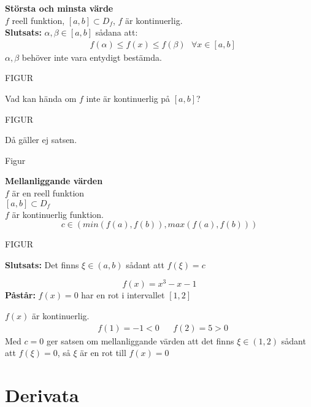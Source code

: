 \begin{sats}
    \textbf{Största och minsta värde}\\
    $f$ reell funktion, $[a, b] \subset D_f$, $f$ är kontinuerlig.\\
    \textbf{Slutsats:} $\alpha,\beta \in [a,b]$ sådana att:
    \begin{align*}
    		&f(\alpha) \le f(x) \le f(\beta) \mbox{ } \forall x \in [a,b]
	\end{align*}
	$\alpha, \beta$ behöver inte vara entydigt bestämda.
	\begin{center}
		FIGUR
	\end{center}
\end{sats}
\begin{Rem}
	Vad kan hända om $f$ inte är kontinuerlig på $[a,b]$?
	\begin{center}
		FIGUR
	\end{center}
	Då gäller ej satsen.
\end{Rem}
\begin{Ex}
    \begin{center}
    	Figur
    \end{center}
\end{Ex}
\begin{sats}
    \textbf{Mellanliggande värden}\\
    $f$ är en reell funktion\\
    $[a,b] \subset D_f$\\
    $f$ är kontinuerlig funktion. 
    \[
    c \in (min(f(a), f(b)), max(f(a), f(b)))
    \]
    \begin{center}
    	FIGUR
    \end{center}
    \textbf{Slutsats:} Det finns $\xi \in (a,b)$ sådant att $f(\xi) = c$
\end{sats}
\begin{Ex}
    \[
    f(x) = x^3 - x - 1
    \]
    \textbf{Påstår:} $f(x) = 0$ har en rot i intervallet $[1,2]$
    \begin{Rem}
    	$f(x)$ är kontinuerlig.
    	\begin{align*}
    		&f(1) = -1 < 0 && f(2) = 5 > 0
    	\end{align*}
    	Med $c = 0$ ger satsen om mellanliggande värden att det finns $\xi \in (1,2)$ sådant att $f(\xi) = 0$, så $\xi$ är en rot till $f(x) = 0$
    \end{Rem}
\end{Ex}

\section{Derivata} %
\label{sec:derivata}

